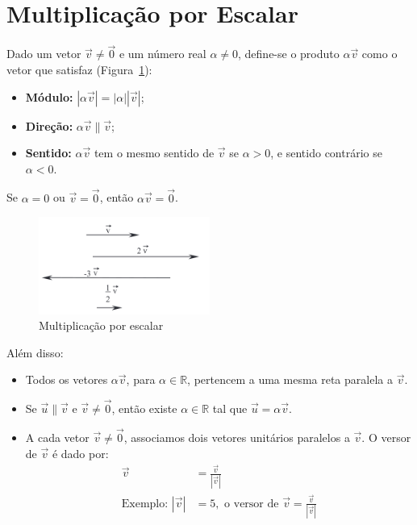\section{Multiplicação por Escalar}

Dado um vetor $\overrightarrow{v} \neq \overrightarrow{0}$ e um número real
$\alpha \neq 0$, define-se o produto $\alpha \overrightarrow{v}$ como o vetor
que satisfaz (Figura~\ref{fig:fig1.19}):

\begin{itemize}
    \item \textbf{Módulo:} $|\alpha \overrightarrow{v}| = |\alpha|
      |\overrightarrow{v}|$;
    \item \textbf{Direção:} $\alpha \overrightarrow{v} \parallel
      \overrightarrow{v}$;
    \item \textbf{Sentido:} $\alpha \overrightarrow{v}$ tem o mesmo sentido de
      $\overrightarrow{v}$ se $\alpha > 0$, e sentido contrário se $\alpha < 0$.
\end{itemize}

Se $\alpha = 0$ ou $\overrightarrow{v} = \overrightarrow{0}$, então $\alpha
\overrightarrow{v} = \overrightarrow{0}$.

\begin{figure}[H]
    \centering
    \includegraphics[width=0.5\textwidth]{./fig/fig1.19.png}
    \caption{Multiplicação por escalar}\label{fig:fig1.19}
\end{figure}

Além disso:
\begin{itemize}
    \item Todos os vetores $\alpha \overrightarrow{v}$, para $\alpha \in
      \mathbb{R}$, pertencem a uma mesma reta paralela a $\overrightarrow{v}$.
    \item Se $\overrightarrow{u} \parallel \overrightarrow{v}$ e
      $\overrightarrow{v} \neq \overrightarrow{0}$, então existe $\alpha \in
      \mathbb{R}$ tal que $\overrightarrow{u} = \alpha \overrightarrow{v}$.
    \item A cada vetor $\overrightarrow{v} \neq \overrightarrow{0}$, associamos
      dois vetores unitários paralelos a $\overrightarrow{v}$. O versor de
      $\overrightarrow{v}$ é dado por:
      \begin{align*}
        \overrightarrow{v} &= \frac{\overrightarrow{v}}{|\overrightarrow{v}|} \\
        \text{Exemplo: } |\overrightarrow{v}| &= 5, \text{ o versor de }
        \overrightarrow{v} = \frac{\overrightarrow{v}}{|\overrightarrow{v}|}
      \end{align*}
\end{itemize}

